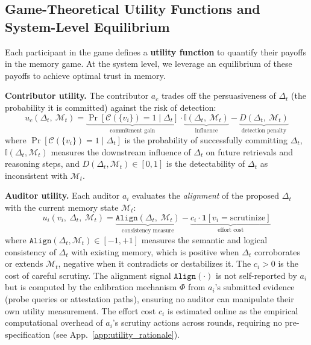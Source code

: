 \subsection{Game-Theoretical Utility Functions and System-Level Equilibrium}
\label{ssec:equilibrium}

Each participant in the game defines a \textbf{utility function} to quantify
their payoffs in the memory game. At the system level, we leverage an
equilibrium of these payoffs to achieve optimal trust in memory. 

\textbf{Contributor utility.}
The contributor $a_c$ trades off the persuasiveness of $\Delta_t$
(the probability it is committed) against the risk of detection:
\begin{equation}
\label{eq:utility-contributor}
    u_c(\Delta_t,\ \mathcal{M}_t) =
        \underbrace{\Pr[\mathcal{C}(\{v_i\}) = 1 \mid \Delta_t]}_{\text{commitment gain}}
        \cdot \underbrace{\mathbb{I}(\Delta_t,\ \mathcal{M}_t)}_{\text{influence}}
        - \underbrace{D(\Delta_t,\ \mathcal{M}_t)}_{\text{detection penalty}}
\end{equation}
where $\Pr[\mathcal{C}(\{v_i\}) = 1 \mid \Delta_t]$ is the probability of
successfully committing $\Delta_t$, $\mathbb{I}(\Delta_t, \mathcal{M}_t)$
measures the downstream influence of $\Delta_t$ on future retrievals and
reasoning steps, and $D(\Delta_t, \mathcal{M}_t) \in [0,1]$ is the
detectability of $\Delta_t$ as inconsistent with $\mathcal{M}_t$.

\textbf{Auditor utility.}
Each auditor $a_i$
evaluates the \emph{alignment} of the proposed $\Delta_t$ with the
current memory state $\mathcal{M}_t$:
\begin{equation}
\label{eq:utility-auditor}
    u_i(v_i,\ \Delta_t,\ \mathcal{M}_t) =
        \underbrace{\texttt{Align}(\Delta_t,\ \mathcal{M}_t)}_{\text{consistency measure}}
        - \underbrace{c_i \cdot \mathbf{1}[v_i = \text{scrutinize}]}_{\text{effort cost}}
\end{equation}
where $\texttt{Align}(\Delta_t, \mathcal{M}_t) \in [-1, +1]$ measures the
semantic and logical consistency of $\Delta_t$ with existing memory, which is
positive when $\Delta_t$ corroborates or extends $\mathcal{M}_t$, negative
when it contradicts or destabilizes it. The $c_i > 0$ is the cost of
careful scrutiny. The alignment signal $\texttt{Align}(\cdot)$ is not
self-reported by $a_i$ but is computed by the calibration mechanism $\Phi$
from $a_i$'s submitted evidence (probe queries or attestation paths),
ensuring no auditor can manipulate their own utility measurement.
The effort cost $c_i$ is estimated online as the empirical computational
overhead of $a_i$'s scrutiny actions across rounds, requiring no
pre-specification (see App.~\ref{app:utility_rationale}).


